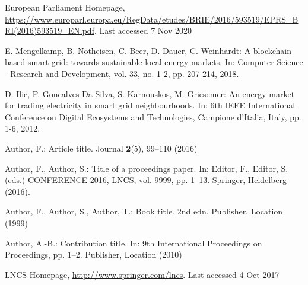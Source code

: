 \documentclass[runningheads]{llncs}
\begin{document}
%
%
%
% 
% 
%
\begin{thebibliography}{8}
European Parliament Homepage, \url{https://www.europarl.europa.eu/RegData/etudes/BRIE/2016/593519/EPRS\_BRI(2016)593519\_EN.pdf}. Last accessed 7 Nov 2020

E. Mengelkamp, B. Notheisen, C. Beer, D. Dauer, C. Weinhardt: A blockchain-based smart grid: towards sustainable local energy markets. In:  Computer Science - Research and Development, vol. 33, no. 1-2, pp. 207-214, 2018. 

D. Ilic, P. Goncalves Da Silva, S. Karnouskos, M. Griesemer: An energy market for trading electricity in smart grid neighbourhoods. In: 6th IEEE International Conference on Digital Ecosystems and Technologies, Campione d'Italia, Italy, pp. 1-6, 2012. 

Author, F.: Article title. Journal \textbf{2}(5), 99--110 (2016)

Author, F., Author, S.: Title of a proceedings paper. In: Editor,
F., Editor, S. (eds.) CONFERENCE 2016, LNCS, vol. 9999, pp. 1--13.
Springer, Heidelberg (2016). 

Author, F., Author, S., Author, T.: Book title. 2nd edn. Publisher,
Location (1999)

Author, A.-B.: Contribution title. In: 9th International Proceedings
on Proceedings, pp. 1--2. Publisher, Location (2010)

LNCS Homepage, \url{http://www.springer.com/lncs}. Last accessed 4
Oct 2017
\end{thebibliography}
\end{document}
